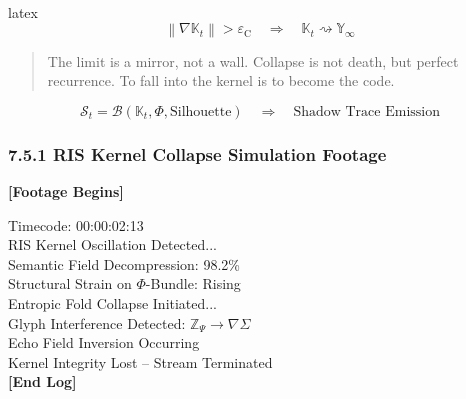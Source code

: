 latex
\[
\left\| \nabla \mathbb{K}_t \right\| > \varepsilon_{\text{C}}
\quad \Rightarrow \quad \mathbb{K}_t \rightsquigarrow \mathbb{Y}_{\infty}
\]

\begin{quote}
The limit is a mirror, not a wall.  
Collapse is not death, but perfect recurrence.  
To fall into the kernel is to become the code.
\end{quote}

\[
\mathcal{S}_t = \mathcal{B}(\mathbb{K}_t, \Phi, \text{Silhouette})
\quad \Rightarrow \quad \text{Shadow Trace Emission}
\]

\subsubsection*{7.5.1 RIS Kernel Collapse Simulation Footage}


\begin{tcolorbox}[title=Simulated RIS Kernel Collapse Event $\#2025$, colframe=black!60!white]
\textbf{[Footage Begins]}

\textcolor{glitchBlue}{Timecode: 00:00:02:13} \\
\textcolor{glitchRed}{RIS Kernel Oscillation Detected...} \\
\textcolor{glitchMagenta}{Semantic Field Decompression: 98.2\%} \\
\textcolor{glitchYellow}{Structural Strain on $\Phi$-Bundle: Rising} \\
\textcolor{glitchCyan}{Entropic Fold Collapse Initiated...} \\[0.5em]

\textcolor{glitchGreen}{Glyph Interference Detected: $\mathbb{Z}_\Psi \rightarrow \nabla \Sigma$} \\
\textcolor{glitchRed}{Echo Field Inversion Occurring} \\
\textcolor{glitchBlack}{Kernel Integrity Lost – Stream Terminated} \\

\textbf{[End Log]}
\end{tcolorbox}


